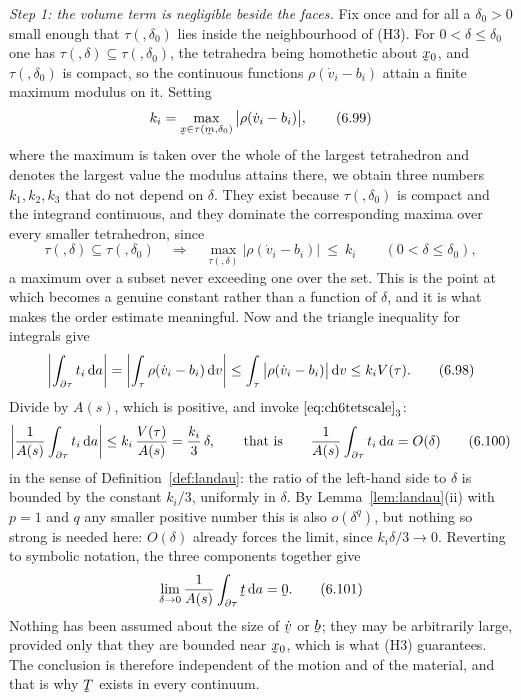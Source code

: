 \emph{Step 1: the volume term is negligible beside the faces.} Fix once
and for all a $\delta_{0}>0$ small enough that $\tau(\bm,\delta_{0})$
lies inside the neighbourhood of \textup{(H3)}. For $0<\delta\le\delta_{0}$
one has $\tau(\bm,\delta)\subseteq\tau(\bm,\delta_{0})$, the tetrahedra
being homothetic about $\bx_{0}$, and $\tau(\bm,\delta_{0})$ is compact,
so the continuous functions $\rho(\dot v_{i}-b_{i})$ attain a finite
maximum modulus on it. Setting
\begin{equation}
   k_{i}=\max_{\bx\in\tau(\bm,\delta_{0})}
   \big|\rho(\dot v_{i}-b_{i})\big| ,
   \tag{6.99}\label{eq:6.99}
\end{equation}
where the maximum is taken over the whole of the largest tetrahedron and
denotes the largest value the modulus attains there, we obtain three
numbers $k_{1},k_{2},k_{3}$ that do not depend on $\delta$. They exist
because $\tau(\bm,\delta_{0})$ is compact and the integrand continuous,
and they dominate the corresponding maxima over every smaller
tetrahedron, since
\[
   \tau(\bm,\delta)\subseteq\tau(\bm,\delta_{0})
   \quad\Longrightarrow\quad
   \max_{\tau(\bm,\delta)}\big|\rho(\dot v_{i}-b_{i})\big|
   \ \le\ k_{i}
   \qquad (0<\delta\le\delta_{0}),
\]
a maximum over a subset never exceeding one over the set. This is the
point at which  becomes a genuine constant rather than a
function of $\delta$, and it is what makes the order estimate
 meaningful. Now  and the triangle inequality for
integrals give
\begin{equation}
   \left|\int_{\partial\tau}t_{i}\,\mathrm{d} a\right|
   =\left|\int_{\tau}\rho(\dot v_{i}-b_{i})\,\mathrm{d} v\right|
   \leq\int_{\tau}\big|\rho(\dot v_{i}-b_{i})\big|\,\mathrm{d} v
   \leq k_{i}V(\tau).
   \tag{6.98}\label{eq:6.98}
\end{equation}
Divide by $A(s)$, which is positive, and invoke
$\eqref{eq:ch6tetscale}_{3}$:
\begin{equation}
   \left|\frac{1}{A(s)}\int_{\partial\tau}t_{i}\,\mathrm{d} a\right|
   \leq k_{i}\,\frac{V(\tau)}{A(s)}=\frac{k_{i}}{3}\,\delta ,
   \qquad\text{that is}\qquad
   \frac{1}{A(s)}\int_{\partial\tau}t_{i}\,\mathrm{d} a=O(\delta)
   \tag{6.100}\label{eq:6.100}
\end{equation}
in the sense of Definition~\ref{def:landau}: the ratio of the left-hand
side to $\delta$ is bounded by the constant $k_{i}/3$, uniformly in
$\delta$. By Lemma~\ref{lem:landau}\textup{(ii)} with $p=1$ and $q$ any
smaller positive number this is also $o(\delta^{q})$, but nothing so
strong is needed here: $O(\delta)$ already forces the limit, since
$k_{i}\delta/3\to0$. Reverting to symbolic notation, the three
components together give
\begin{equation}
   \lim_{\delta\to0}\frac{1}{A(s)}\int_{\partial\tau}\bt\,\dl a=\bze .
   \tag{6.101}\label{eq:6.101}
\end{equation}
Nothing has been assumed about the size of $\dot\bv$ or $\bb$; they may
be arbitrarily large, provided only that they are bounded near
$\bx_{0}$, which is what \textup{(H3)} guarantees. The conclusion is
therefore independent of the motion and of the material, and that is why
$\bT$ exists in every continuum.

